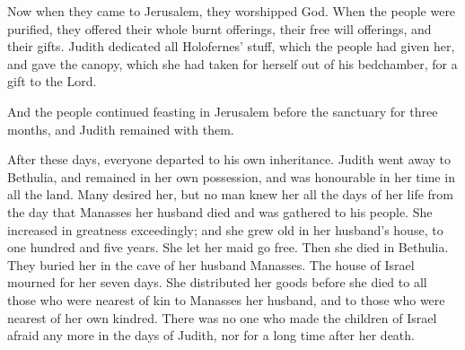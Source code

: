  Now when they came to Jerusalem, they worshipped God. When
the people were purified, they offered their whole burnt offerings,
their free will offerings, and their gifts.  Judith
dedicated all Holofernes' stuff, which the people had given her, and
gave the canopy, which she had taken for herself out of his bedchamber,
for a gift to the Lord.

 And the people continued feasting in Jerusalem before the
sanctuary for three months, and Judith remained with them.

 After these days, everyone departed to his own
inheritance. Judith went away to Bethulia, and remained in her own
possession, and was honourable in her time in all the land.
 Many desired her, but no man knew her all the days of her
life from the day that Manasses her husband died and was gathered to his
people.  She increased in greatness exceedingly; and she
grew old in her husband's house, to one hundred and five years. She let
her maid go free. Then she died in Bethulia. They buried her in the cave
of her husband Manasses.  The house of Israel mourned for
her seven days. She distributed her goods before she died to all those
who were nearest of kin to Manasses her husband, and to those who were
nearest of her own kindred.  There was no one who made the
children of Israel afraid any more in the days of Judith, nor for a long
time after her death.
